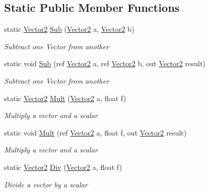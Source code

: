 \subsection*{Static Public Member Functions}
\begin{DoxyCompactItemize}
\item 
static \hyperlink{struct_open_t_k_1_1_vector2}{Vector2} \hyperlink{struct_open_t_k_1_1_vector2_a2a4d3f2c7ca83945ba71e446fbadec3f}{Sub} (\hyperlink{struct_open_t_k_1_1_vector2}{Vector2} a, \hyperlink{struct_open_t_k_1_1_vector2}{Vector2} b)
\begin{DoxyCompactList}\small\item\em Subtract one Vector from another \end{DoxyCompactList}\item 
static void \hyperlink{struct_open_t_k_1_1_vector2_a85ac149af146e99311e088347c393081}{Sub} (ref \hyperlink{struct_open_t_k_1_1_vector2}{Vector2} a, ref \hyperlink{struct_open_t_k_1_1_vector2}{Vector2} b, out \hyperlink{struct_open_t_k_1_1_vector2}{Vector2} result)
\begin{DoxyCompactList}\small\item\em Subtract one Vector from another \end{DoxyCompactList}\item 
static \hyperlink{struct_open_t_k_1_1_vector2}{Vector2} \hyperlink{struct_open_t_k_1_1_vector2_a5b75f127520431a1e635d0120d39cfe6}{Mult} (\hyperlink{struct_open_t_k_1_1_vector2}{Vector2} a, float f)
\begin{DoxyCompactList}\small\item\em Multiply a vector and a scalar \end{DoxyCompactList}\item 
static void \hyperlink{struct_open_t_k_1_1_vector2_a80d890db67351a5a03040966516b260d}{Mult} (ref \hyperlink{struct_open_t_k_1_1_vector2}{Vector2} a, float f, out \hyperlink{struct_open_t_k_1_1_vector2}{Vector2} result)
\begin{DoxyCompactList}\small\item\em Multiply a vector and a scalar \end{DoxyCompactList}\item 
static \hyperlink{struct_open_t_k_1_1_vector2}{Vector2} \hyperlink{struct_open_t_k_1_1_vector2_ade4f736046eb659e3e1855f75ae22f3a}{Div} (\hyperlink{struct_open_t_k_1_1_vector2}{Vector2} a, float f)
\begin{DoxyCompactList}\small\item\em Divide a vector by a scalar \end{DoxyCompactList}\item 

\end{DoxyCompactItemize}
